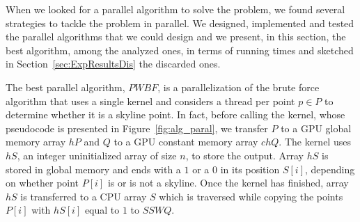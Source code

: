 \documentclass[11pt,onecolumn]{elsart3p}
\begin{document}
        When we looked for a parallel algorithm to solve the problem, we found several strategies to tackle the problem in parallel. We designed, implemented and tested the parallel algorithms that we could design and we present, in this section, the best algorithm, among the analyzed ones, in terms of running times and sketched in Section~\ref{sec:ExpResultsDis} the discarded ones.


        The best parallel algorithm, $PWBF$, is a parallelization of the brute force algorithm that uses a single kernel and considers a thread per point $p\in P$ to determine whether it is a skyline point. In fact, before calling the kernel, whose pseudocode is presented in Figure~\ref{fig:alg_paral}, we transfer $P$ to a GPU global memory array $hP$ and $Q$ to a GPU constant memory array $chQ$. The kernel uses $hS$, an integer uninitialized array of size $n$, to store the output. Array $hS$ is stored in global memory and ends with a $1$ or a $0$ in its position $S[i]$, depending on whether point $P[i]$ is or is not a skyline. Once the kernel has finished, array $hS$ is transferred to a CPU array $S$ which is traversed while copying the points $P[i]$ with $hS[i]$ equal to $1$ to $SSWQ$.
\end{document}
